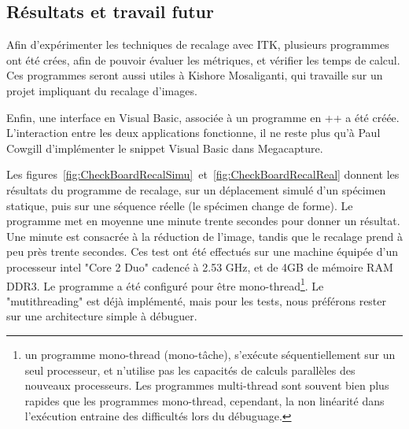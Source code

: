 \subsection{Résultats et travail futur}

Afin d'expérimenter les techniques de recalage avec ITK, plusieurs programmes ont été crées, afin de pouvoir évaluer les métriques, et vérifier les temps de calcul. Ces programmes seront aussi utiles à Kishore Mosaliganti, qui travaille sur un projet impliquant du recalage d'images.

Enfin, une interface en Visual Basic, associée à un programme en \C++ a été créée. L'interaction entre les deux applications fonctionne, il ne reste plus qu'à Paul Cowgill d'implémenter le snippet Visual Basic dans Megacapture.

Les figures~\ref{fig:CheckBoardRecalSimu}~et~\ref{fig:CheckBoardRecalReal}  donnent les résultats du programme de recalage, sur un déplacement simulé d'un spécimen statique, puis sur une séquence réelle (le spécimen change de forme).
Le programme met en moyenne une minute trente secondes pour donner un résultat.
Une minute est consacrée à la réduction de l'image, tandis que le recalage prend à peu près trente secondes.
Ces test ont été effectués sur une machine équipée d'un processeur intel "Core 2 Duo" cadencé à 2.53 GHz, et de 4GB de mémoire RAM DDR3. Le programme a été configuré pour être mono-thread\footnote{un programme mono-thread (mono-tâche), s'exécute séquentiellement sur un seul processeur, et n'utilise pas les capacités de calculs parallèles des nouveaux processeurs. Les programmes multi-thread sont souvent bien plus rapides que les programmes mono-thread, cependant, la non linéarité dans l'exécution entraine des difficultés lors du débuguage.}. Le "mutithreading" est déjà implémenté, mais pour les tests, nous préférons rester sur une architecture simple à débuguer.



